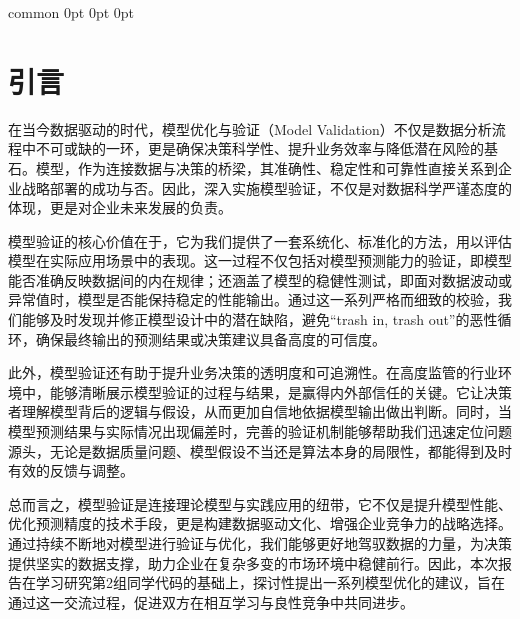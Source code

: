 \documentclass[
    report,     %
    oneside,    %
    UTF8,       %
    zihao=-4    %
]{config} %
\begin{document}

\Footer
    {common} %
    {0pt} %
    {0pt} %
    {0pt} %
    {} %
    {\thepage} %
    {} %


\SetArabicPageNumber{} %



\chapter{引言}

在当今数据驱动的时代，模型优化与验证（Model Validation）不仅是数据分析流程中不可或缺的一环，更是确保决策科学性、提升业务效率与降低潜在风险的基石。模型，作为连接数据与决策的桥梁，其准确性、稳定性和可靠性直接关系到企业战略部署的成功与否。因此，深入实施模型验证，不仅是对数据科学严谨态度的体现，更是对企业未来发展的负责。

模型验证的核心价值在于，它为我们提供了一套系统化、标准化的方法，用以评估模型在实际应用场景中的表现。这一过程不仅包括对模型预测能力的验证，即模型能否准确反映数据间的内在规律；还涵盖了模型的稳健性测试，即面对数据波动或异常值时，模型是否能保持稳定的性能输出。通过这一系列严格而细致的校验，我们能够及时发现并修正模型设计中的潜在缺陷，避免“trash in, trash out”的恶性循环，确保最终输出的预测结果或决策建议具备高度的可信度。

此外，模型验证还有助于提升业务决策的透明度和可追溯性。在高度监管的行业环境中，能够清晰展示模型验证的过程与结果，是赢得内外部信任的关键。它让决策者理解模型背后的逻辑与假设，从而更加自信地依据模型输出做出判断。同时，当模型预测结果与实际情况出现偏差时，完善的验证机制能够帮助我们迅速定位问题源头，无论是数据质量问题、模型假设不当还是算法本身的局限性，都能得到及时有效的反馈与调整。

总而言之，模型验证是连接理论模型与实践应用的纽带，它不仅是提升模型性能、优化预测精度的技术手段，更是构建数据驱动文化、增强企业竞争力的战略选择。通过持续不断地对模型进行验证与优化，我们能够更好地驾驭数据的力量，为决策提供坚实的数据支撑，助力企业在复杂多变的市场环境中稳健前行。因此，本次报告在学习研究第2组同学代码的基础上，探讨性提出一系列模型优化的建议，旨在通过这一交流过程，促进双方在相互学习与良性竞争中共同进步。
\end{document}
